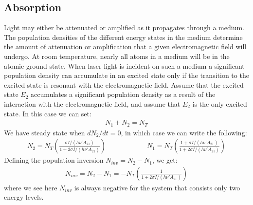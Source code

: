 \documentclass[11pt]{book}
\theoremstyle{break}
\theoremstyle{break}
\begin{document}
\subsection{Absorption}
Light may either be attenuated or amplified as it propagates through a
 medium. The population densities of the different energy states in the medium
determine the amount of attenuation or amplification that a given electromagnetic field will undergo. At room temperature, nearly all atoms in a medium will be in the atomic ground state. When laser light is incident on such a medium 
a significant population density can accumulate in an excited state only if the
transition to the excited state is resonant with the electromagnetic field. Assume that the excited state $E_2$  accumulates a significant population density as a result of the interaction with the electromagnetic field, and assume that $E_2$ is the only excited state. In this case we can set:
\begin{align*}
N_1 + N_2 = N_T
\end{align*}
We have steady state when $dN_2 / dt = 0$, in which case we can write the following:
\begin{align*}
N_2 = N_T\left( \frac{\sigma I/(h\nu'A_{21})}{1 + 2\sigma I /(h\nu' A_{21})}\right) \qquad\qquad\qquad N_1 = N_T\left( \frac{1+\sigma I/(h\nu' A_{21})}{1+2\sigma I/(h\nu'A_{21})}\right)
\end{align*}
Defining the population inversion $N_{inv} = N_2 - N_1$, we get:
\begin{align*}
N_{inv} = N_2 - N_1 = -N_T\left( \frac{1}{1+ 2\sigma I/(h\nu' A_{21})}\right)
\end{align*}
where we see here $N_{inv}$ is always negative for the system that consists only two energy levels. \\
\end{document}
